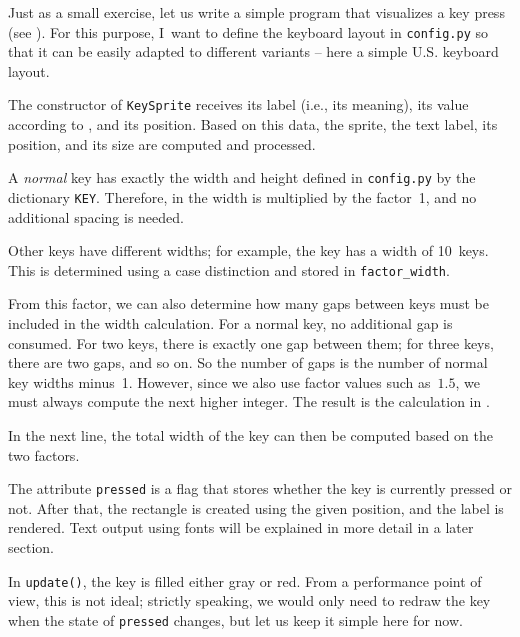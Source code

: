
Just as a small exercise, let us write a simple program that visualizes a key press (see ). For this purpose, I~want to define the keyboard layout in \texttt{config.py} so that it can be easily adapted to different variants -- here a simple U.S. keyboard layout.
 

The constructor of \texttt{KeySprite} receives its label (i.e., its meaning), its value according to , and its position. Based on this data, the sprite, the text label, its position, and its size are computed and processed.

A \emph{normal} key has exactly the width and height defined in \texttt{config.py} by the dictionary \texttt{KEY}. Therefore, in  the width is multiplied by the factor~1, and no additional spacing is needed.

Other keys have different widths; for example, the  key has a width of 10~keys. This is determined using a case distinction and stored in
\texttt{factor\_width}.

From this factor, we can also determine how many gaps between keys must be included in the width calculation. For a normal key, no additional gap is consumed. For two keys, there is exactly one gap between them; for three keys, there are two gaps, and so on. So the number of gaps is the number of normal key widths minus~1. However, since we also use factor values such as~$1.5$, we must always compute the next higher integer. The result is the calculation in .

In the next line, the total width of the key can then be computed based on the two factors.

The attribute \texttt{pressed} is a flag that stores whether the key is currently pressed or not. After that, the rectangle is created using the given position, and the label is rendered. Text output using fonts will be explained in more detail in a later section.

In \texttt{update()}, the key is filled either gray or red. From a performance point of view, this is not ideal; strictly speaking, we would only need to redraw the key when the state of \texttt{pressed} changes, but let us keep it simple here for now.

